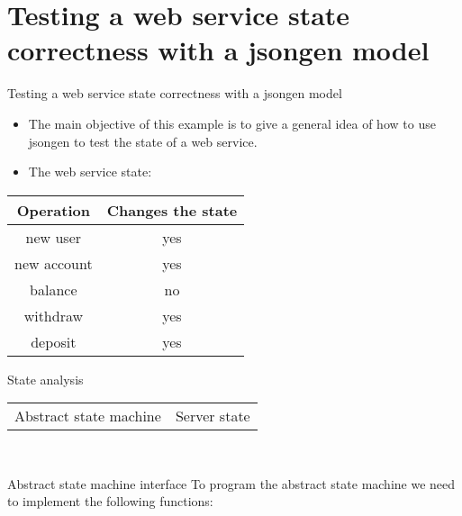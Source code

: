 \section{Testing a web service state correctness with a jsongen model}

\begin{frame}{Testing a web service state correctness with a jsongen model}
  \begin{itemize}
  \item The main objective of this example is to give a general idea
    of how to use jsongen to test the state of a web service.
  \item The web service state:\\
  \end{itemize}
  \vspace{20pt}
  \centering
  \begin{tabular}{| c | c |}
    \hline
    \textbf{Operation}   & \textbf{Changes the state} \\ \hline
    new user    & yes \\ \hline
    new account & yes \\ \hline
    balance     & no \\ \hline
    withdraw    & yes \\ \hline
    deposit     & yes \\ \hline
  \end{tabular}
  \centering
\end{frame}

\begin{frame}{State analysis}
  \vspace{10pt}
  \begin{tabular}{p{7cm} l}
    {\Large Abstract state machine}&{\Large Server state}
  \end{tabular}
  \\
  \begin{figure}
    \centering
    \begin{overprint}[\textwidth]
    \end{overprint}
  \end{figure}
\end{frame}


\begin{frame}{Abstract state machine interface}
  To program the abstract state machine we need to implement the
  following functions:

  \inputminted{erlang}{./code/interface.erl}
\end{frame}

